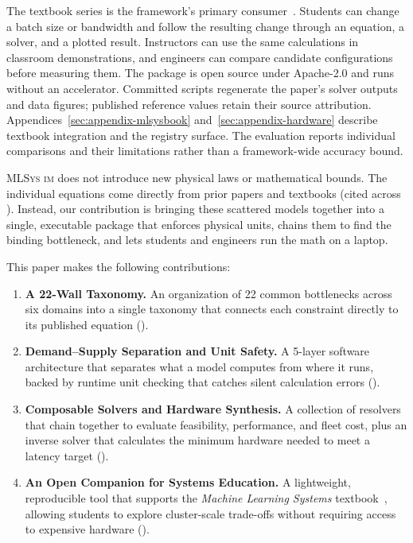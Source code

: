 \documentclass[10pt,twocolumn]{article}
\newcommand{\mlsysim}{\mbox{\textsc{MLSys}\,\textperiodcentered\,\textsc{im}}\xspace}
\begin{document}
The textbook series is the framework's primary consumer~\citep{mlsysbook2025}. Students can change a batch size or bandwidth and follow the resulting change through an equation, a solver, and a plotted result. Instructors can use the same calculations in classroom demonstrations, and engineers can compare candidate configurations before measuring them. The package is open source under Apache-2.0 and runs without an accelerator. Committed scripts regenerate the paper's solver outputs and data figures; published reference values retain their source attribution. Appendices~\ref{sec:appendix-mlsysbook} and~\ref{sec:appendix-hardware} describe textbook integration and the registry surface. The evaluation reports individual comparisons and their limitations rather than a framework-wide accuracy bound.

\mlsysim does not introduce new physical laws or mathematical bounds. The individual equations come directly from prior papers and textbooks (cited across ). Instead, our contribution is bringing these scattered models together into a single, executable package that enforces physical units, chains them to find the binding bottleneck, and lets students and engineers run the math on a laptop.

This paper makes the following contributions:

\begin{enumerate}[leftmargin=*,itemsep=3pt,label=\textbf{C\arabic*.}]
    \item \textbf{A 22-Wall Taxonomy.} An organization of 22 common bottlenecks across six domains into a single taxonomy that connects each constraint directly to its published equation ().

    \item \textbf{Demand--Supply Separation and Unit Safety.} A 5-layer software architecture that separates what a model computes from where it runs, backed by runtime unit checking that catches silent calculation errors ().

    \item \textbf{Composable Solvers and Hardware Synthesis.} A collection of \CountResolvers{} resolvers that chain together to evaluate feasibility, performance, and fleet cost, plus an inverse solver that calculates the minimum hardware needed to meet a latency target ().

    \item \textbf{An Open Companion for Systems Education.} A lightweight, reproducible tool that supports the \emph{Machine Learning Systems} textbook~\citep{mlsysbook2025}, allowing students to explore cluster-scale trade-offs without requiring access to expensive hardware ().
\end{enumerate}
\end{document}
